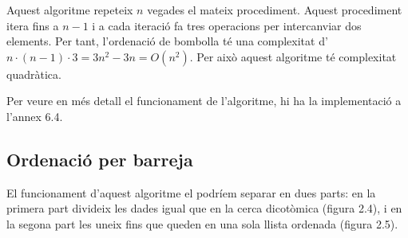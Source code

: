 Aquest algoritme repeteix $n$ vegades el mateix procediment. Aquest procediment itera fins a $n-1$ i a cada iteració fa tres operacions per intercanviar dos elements. Per tant, l'ordenació de bombolla té una complexitat d'$n \cdot (n-1) \cdot 3 = 3n^2 - 3n = O(n^2)$. Per això aquest algoritme té complexitat quadràtica.

Per veure en més detall el funcionament de l'algoritme, hi ha la implementació a l'annex 6.4.

\subsection{Ordenació per barreja} %
El funcionament d'aquest algoritme el podríem separar en dues parts: en la primera part divideix les dades igual que en la cerca dicotòmica (figura 2.4), i en la segona part les uneix fins que queden en una sola llista ordenada (figura 2.5).

